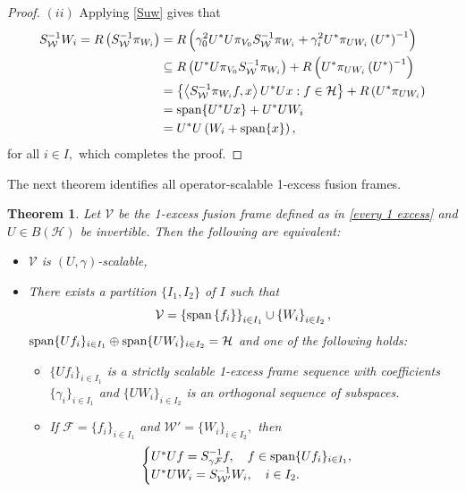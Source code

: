 \documentclass[sn-mathphys-num]{sn-jnl}%
\newtheorem{theorem}{Theorem}[section]
\theoremstyle{definition}
\theoremstyle{remark}
\numberwithin{equation}{section}
\begin{document}
\begin{proof}
$(ii)$ Applying \eqref{Suw} gives that
\begin{align*}
S_{\mathcal{W}}^{-1}W_{i}=R\left( S_{\mathcal{W}}^{-1}\pi_{W_{i}}\right) &=R\left( \gamma_{0}^{2}U^{*}U\pi_{V_{0}}S_{\mathcal{W}}^{-1}\pi_{W_{i}}+\gamma_{i}^{2}U^{*}\pi_{UW_{i}}\left( U^{*}\right) ^{-1}\right) 
\\&\subseteq R\left(U^{*}U\pi_{V_{0}}S_{\mathcal{W}}^{-1}\pi_{W_{i}} \right) +R\left(U^{*}\pi_{UW_{i}}\left( U^{*}\right) ^{-1} \right)
\\&=\left\lbrace  \left\langle  S_{\mathcal{W}}^{-1}\pi_{W_{i}}f,x \right\rangle  U^{*}Ux : f \in \mathcal{H}  \right\rbrace  +R\left(U^{*}\pi_{UW_{i}}\right)
\\&=\textnormal{span}\{U^{*}Ux\}+U^{*}UW_{i}
\\&=U^{*}U\left( W_{i}+\textnormal{span}\{x\}\right),
\end{align*}
for all $i \in I,$ which completes the proof. 
\end{proof}

The next theorem identifies all operator-scalable 1-excess fusion frames.

\begin{theorem}\label{two equivalent}
Let $\mathcal{V}$ be the 1-excess fusion frame defined as in \eqref{every 1 excess} and $U \in B(\mathcal {H})$ be invertible. Then the following are equivalent:
\begin{itemize}
\item[$(i)$] $\mathcal{V}$ is $(U,\gamma)$-scalable,
\item[$(ii)$] There exists a partition $\{I_{1},I_{2}\}$ of $I$ such that 
\begin{equation*}
\mathcal{V}=\left\lbrace \textnormal{span}\left\lbrace f_{i} \right\rbrace \right\rbrace _{i \in I_{1}}\cup \left\lbrace W_{i} \right\rbrace _{i \in I_{2}},
\end{equation*}
$\textnormal{span}\{Uf_{i}\}_{i \in I_{1}}\oplus \textnormal{span}\{UW_{i}\}_{i \in I_{2}}=\mathcal {H}$ and one of the following holds:
\begin{itemize}
\item[$(a)$] $\{Uf_{i}\}_{i \in I_{1}}$ is a strictly scalable 1-excess frame sequence with coefficients $\{\gamma_{i}\}_{i \in I_{1}}$ and $\{UW_{i}\}_{i \in I_{2}}$ is an orthogonal sequence of subspaces.

\item[$(b)$] If $\mathcal{F}=\{f_{i}\}_{i \in I_{1}}$ and $\mathcal{W}'=\{W_{i}\}_{i \in I_{2}},$ then 
\begin{align*}
\begin{cases}
 U^{*}Uf=S_{\gamma \mathcal{F}}^{-1}f, \quad  f \in \textnormal{span}\{Uf_{i}\}_{i \in I_{1}}, 
\\U^{*}UW_{i}=S_{\mathcal{W}'}^{-1}W_{i}, \quad  i \in I_{2}.
\end{cases}
\end{align*}
\end{itemize}
\end{itemize}
\end{theorem}
\end{document}
